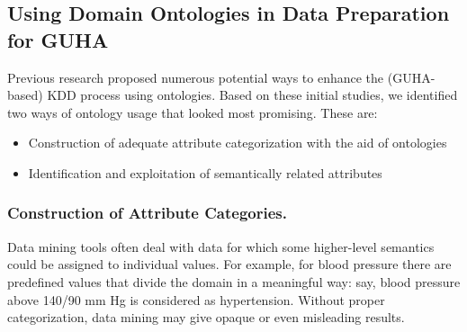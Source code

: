 

\subsection{Using Domain Ontologies in Data Preparation for GUHA}
\label{OntologiesDataPrep}

Previous research \cite{Cespivova,Ralbovsky} proposed numerous potential ways to enhance the (GUHA-based) KDD process using ontologies. 
Based on these initial studies, we identified two ways of ontology usage that looked most promising. 
These are:
\begin{itemize}
	\item Construction of adequate attribute categorization with the aid of ontologies
	\item Identification and exploitation of semantically related attributes
\end{itemize}

\subsubsection{Construction of Attribute Categories.}

Data mining tools often deal with data for which some higher-level semantics could be assigned to individual values.
For example, for blood pressure there are predefined values that divide the domain in a meaningful way: say, blood pressure above 140/90 mm Hg is considered as hypertension. 
Without proper categorization, data mining may give opaque or even misleading results.

